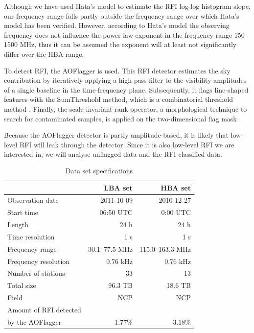 \documentclass[useAMS,usenatbib]{mn2e}
\begin{document}
Although we have used Hata's model to estimate the RFI log-log histogram slope, our frequency range falls partly outside the frequency range over which Hata's model has been verified. However, according to Hata's model the observing frequency does not influence the power-law exponent in the frequency range 150--1500 MHz, thus it can be assumed the exponent will at least not significantly differ over the HBA range.

To detect RFI, the AOFlagger \citep{LOFAR-RFI-pipeline} is used. This RFI detector estimates the sky contribution by iteratively applying a high-pass filter to the visibility amplitudes of a single baseline in the time-frequency plane. Subsequently, it flags line-shaped features with the SumThreshold method, which is a combinatorial threshold method \citep{post-correlation-rfi-classification}. Finally, the scale-invariant rank operator, a morphological technique to search for contaminated samples, is applied on the two-dimensional flag mask \citep{scale-invariant-rank-operator}.

Because the AOFlagger detector is partly amplitude-based, it is likely that low-level RFI will leak through the detector. Since it is also low-level RFI we are interested in, we will analyse unflagged data and the RFI classified data.

\begin{table}
\caption{Data set specifications}\label{table:dist-data-specs}
\begin{center}
\begin{tabular}{lrr}
                    & \textbf{LBA set}& \textbf{HBA set} \\
\hline
\hline
Observation date    & 2011-10-09      & 2010-12-27 \\
Start time          & 06:50 UTC       & 0:00 UTC \\
Length              & 24 h           & 24 h \\
Time resolution     & 1 s             & 1 s \\
\hline
Frequency range     &  30.1--77.5 MHz & 115.0--163.3 MHz\\
Frequency resolution & 0.76 kHz    & 0.76 kHz \\
Number of stations  &  33           & 13 \\
Total size          & 96.3 TB        & 18.6 TB \\
\hline
Field               & NCP             & NCP \\
Amount of RFI detected & & \\
by the AOFlagger    & 1.77\%       & 3.18\% \\
\hline
\hline
\end{tabular}
\end{center}
\end{table}
\end{document}
